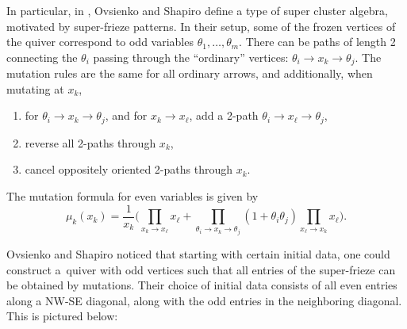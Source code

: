 \documentclass[pdftex]{sigma}
\numberwithin{equation}{section}
\begin{document}
In particular, in \cite{OS19}, Ovsienko and Shapiro define a type of super cluster algebra, motivated by super-frieze patterns. In
their setup, some of the frozen vertices of the quiver correspond to odd variables $\theta_1,\dots,\theta_m$.
There can be paths of length 2 connecting the $\theta_i$ passing through the ``ordinary'' vertices: $\theta_i \to x_k \to \theta_j$.
The mutation rules are the same for all ordinary arrows, and additionally, when mutating at $x_k$,
\begin{enumerate}\itemsep=0pt
 \item[1)] for $\theta_i \to x_k \to \theta_j$, and for $x_k \to x_\ell$, add a 2-path $\theta_i \to x_\ell \to \theta_j$,
 \item[2)] reverse all 2-paths through $x_k$,
 \item[3)] cancel oppositely oriented 2-paths through $x_k$.
\end{enumerate}
The mutation formula for even variables is given by
\[  \mu_k(x_k) =\frac{1}{x_k}\bigg( \prod_{ x_k\to x_\ell} x_\ell+ \prod_{\theta_i \to x_k \to \theta_j} (1 + \theta_i \theta_j) \prod_{x_\ell \to x_k} x_\ell \bigg).\]

Ovsienko and Shapiro noticed that starting with certain initial data, one could construct a~quiver with odd vertices such that
all entries of the super-frieze can be obtained by mutations. Their choice of initial data
consists of all even entries along a NW-SE diagonal, along with the odd entries in the neighboring diagonal. This is pictured below:
\end{document}
